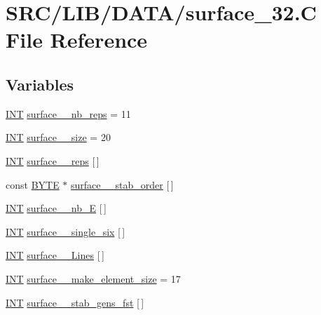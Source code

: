 \hypertarget{surface__32_8_c}{}\section{S\+R\+C/\+L\+I\+B/\+D\+A\+T\+A/surface\+\_\+32.C File Reference}
\label{surface__32_8_c}
\subsection*{Variables}
\begin{DoxyCompactItemize}
\item 
\mbox{\hyperlink{galois_8h_a09fddde158a3a20bd2dcadb609de11dc}{I\+NT}} \mbox{\hyperlink{surface__32_8_c_a75af8195fff8338be46e0bdbbca1cdab}{surface\+\_\+\_\+nb\+\_\+reps}} = 11
\item 
\mbox{\hyperlink{galois_8h_a09fddde158a3a20bd2dcadb609de11dc}{I\+NT}} \mbox{\hyperlink{surface__32_8_c_afed91ecb1bbab51c2317bed567567703}{surface\+\_\+\_\+size}} = 20
\item 
\mbox{\hyperlink{galois_8h_a09fddde158a3a20bd2dcadb609de11dc}{I\+NT}} \mbox{\hyperlink{surface__32_8_c_a22696f36fa8db9ac4b609ae520a4ae30}{surface\+\_\+\_\+reps}} \mbox{[}$\,$\mbox{]}
\item 
const \mbox{\hyperlink{galois_8h_ab6cc7b4aeb6ea31aba2b3fbfc83ff5e6}{B\+Y\+TE}} $\ast$ \mbox{\hyperlink{surface__32_8_c_ac851d57991b1816da1c53ac86064a626}{surface\+\_\+\_\+stab\+\_\+order}} \mbox{[}$\,$\mbox{]}
\item 
\mbox{\hyperlink{galois_8h_a09fddde158a3a20bd2dcadb609de11dc}{I\+NT}} \mbox{\hyperlink{surface__32_8_c_acb6f851a47b4520e9f862e531a35d3c3}{surface\+\_\+\_\+nb\+\_\+E}} \mbox{[}$\,$\mbox{]}
\item 
\mbox{\hyperlink{galois_8h_a09fddde158a3a20bd2dcadb609de11dc}{I\+NT}} \mbox{\hyperlink{surface__32_8_c_ae0dcc68a7bd2804c27a3eaa97b8d38dc}{surface\+\_\+\_\+single\+\_\+six}} \mbox{[}$\,$\mbox{]}
\item 
\mbox{\hyperlink{galois_8h_a09fddde158a3a20bd2dcadb609de11dc}{I\+NT}} \mbox{\hyperlink{surface__32_8_c_a97c57127568be8de4e7bbb0d269276bd}{surface\+\_\+\_\+\+Lines}} \mbox{[}$\,$\mbox{]}
\item 
\mbox{\hyperlink{galois_8h_a09fddde158a3a20bd2dcadb609de11dc}{I\+NT}} \mbox{\hyperlink{surface__32_8_c_afd90a1d57467eb39abfc42e73f12d738}{surface\+\_\+\_\+make\+\_\+element\+\_\+size}} = 17
\item 
\mbox{\hyperlink{galois_8h_a09fddde158a3a20bd2dcadb609de11dc}{I\+NT}} \mbox{\hyperlink{surface__32_8_c_a6cd1d992af80bb8010827dceea0bc84f}{surface\+\_\+\_\+stab\+\_\+gens\+\_\+fst}} \mbox{[}$\,$\mbox{]}

\end{DoxyCompactItemize}
